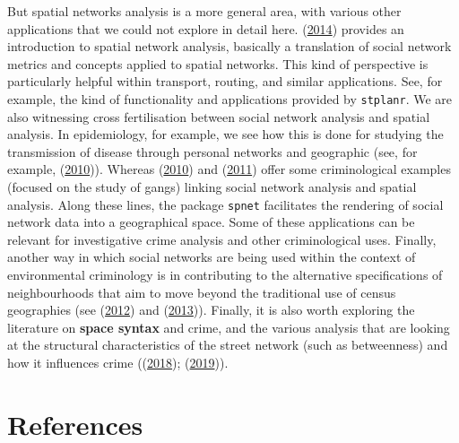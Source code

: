 \documentclass[
  krantz2]{krantz}
\begin{document}
But spatial networks analysis is a more general area, with various other applications that we could not explore in detail here. (\protect\hyperlink{ref-OSullivan_2014}{2014}) provides an introduction to spatial network analysis, basically a translation of social network metrics and concepts applied to spatial networks. This kind of perspective is particularly helpful within transport, routing, and similar applications. See, for example, the kind of functionality and applications provided by \texttt{stplanr}. We are also witnessing cross fertilisation between social network analysis and spatial analysis. In epidemiology, for example, we see how this is done for studying the transmission of disease through personal networks and geographic (see, for example, (\protect\hyperlink{ref-Emch_2010}{2010})). Whereas (\protect\hyperlink{ref-Radil_2010}{2010}) and (\protect\hyperlink{ref-Tita_2011}{2011}) offer some criminological examples (focused on the study of gangs) linking social network analysis and spatial analysis. Along these lines, the package \texttt{spnet} facilitates the rendering of social network data into a geographical space. Some of these applications can be relevant for investigative crime analysis and other criminological uses. Finally, another way in which social networks are being used within the context of environmental criminology is in contributing to the alternative specifications of neighbourhoods that aim to move beyond the traditional use of census geographies (see (\protect\hyperlink{ref-Hipp_2012}{2012}) and (\protect\hyperlink{ref-Hipp_2013}{2013})). Finally, it is also worth exploring the literature on \textbf{space syntax} and crime, and the various analysis that are looking at the structural characteristics of the street network (such as betweenness) and how it influences crime ((\protect\hyperlink{ref-Davies_2018}{2018}); (\protect\hyperlink{ref-Kim_2019}{2019})).

\hypertarget{references}{%
\chapter*{References}\label{references}}
\end{document}
